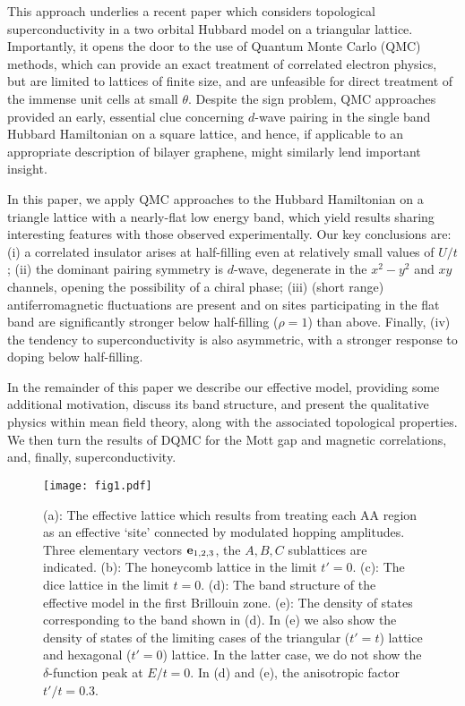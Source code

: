 \documentclass[%
 reprint,
 amsmath,amssymb,
 aps,
]{revtex4-1}
\begin{document}
This approach underlies a recent paper which considers topological
superconductivity in a two orbital Hubbard model on
a triangular lattice\cite{xu18}.
Importantly, it opens the door to the use of
Quantum Monte Carlo (QMC) methods,
which can provide an exact
treatment of correlated electron physics, but are limited
to lattices of finite size, and are unfeasible for direct treatment of
the immense unit cells at small $\theta$.
Despite the sign problem\cite{loh90,troyer05,vlad2015},
QMC approaches provided an early, essential clue concerning
$d$-wave pairing in the single band Hubbard
Hamiltonian on a square lattice\cite{scalapino86,white89a,white89b},
and hence, if applicable to an appropriate description of bilayer
graphene, might similarly lend important insight.

In this paper, we apply QMC approaches to
the Hubbard Hamiltonian on a triangle lattice with a
nearly-flat low energy band, which yield results sharing interesting features
with those observed experimentally\cite{cao18a,cao18b}.
Our key conclusions are:
(i)  a correlated insulator arises at half-filling even at relatively
small values of $U/t$;
(ii)  the dominant pairing symmetry is $d$-wave,
degenerate in the $x^2-y^2$ and $xy$ channels, opening the
possibility of a chiral phase;
(iii) (short range) antiferromagnetic fluctuations are present and
on sites participating in the flat band are
significantly stronger below half-filling ($\rho=1$) than above.  Finally,
(iv)  the tendency to superconductivity is also asymmetric,
with a stronger response to doping below half-filling.

In the remainder of this paper we describe our effective model,
providing some additional motivation, discuss its band structure,
and present the qualitative physics within mean field theory, along with
the associated topological properties.  We then turn the results of DQMC
for the Mott gap and magnetic correlations, and, finally,
superconductivity.


\begin{figure}[htbp]
\centering \texttt{[image: fig1.pdf]} \caption{(a): The effective lattice which results from
treating each AA region as an effective `site' connected by
modulated hopping amplitudes.
Three elementary
vectors ${\bf e}_{1,2,3}$, the $A, B, C$ sublattices are indicated. (b): The honeycomb lattice in the limit $t'=0$. (c): The dice lattice in the limit $t=0$. (d):
The band structure of the effective model in the first Brillouin zone.
(e): The density of states corresponding to the band shown in (d). In (e) we also show the density of states of the limiting cases of the triangular ($t'=t$) lattice and
hexagonal ($t'=0$) lattice. In the latter case,
we do not show the $\delta$-function peak at $E/t=0$.
In (d)
and (e), the anisotropic factor $t'/t=0.3$.
}
\label{fig1}
\end{figure}
\end{document}
